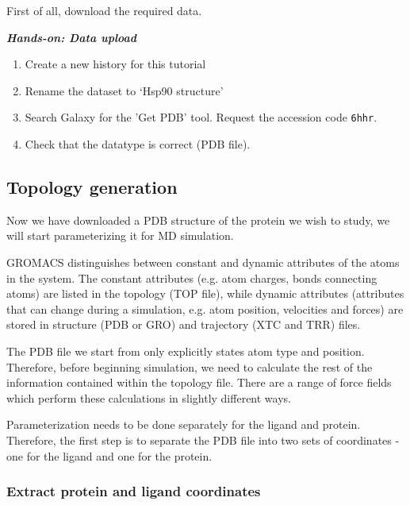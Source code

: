 \documentclass[twocolumn]{bmcart}%
\providecommand{\tightlist}{%
  \setlength{\itemsep}{0pt}\setlength{\parskip}{0pt}}
\providecommand{\tightlist}{%
  \setlength{\itemsep}{0pt}\setlength{\parskip}{0pt}}
\newenvironment{handson_box}
    {\begin{center}
    
    \begin{tabular}{|p{0.9\textwidth/2}|}
    \hline\\
    }
    { 
    \\\\\hline
    \end{tabular} 
    \end{center}
    }
\begin{document}
First of all, download the required data.
\begin{handson_box}
\textbf{\emph{Hands-on: Data upload}}

\begin{enumerate}
\def\labelenumi{\arabic{enumi}.}
\tightlist
\item
  Create a new history for this tutorial

\item
  Rename the dataset to `Hsp90 structure'
\item
  Search Galaxy for the 'Get PDB' tool. Request the accession code \texttt{6hhr}.
\item
  Check that the datatype is correct (PDB file).
\end{enumerate}
\end{handson_box}
\subsection{Topology generation}\label{topology-generation}

Now we have downloaded a PDB structure of the protein we wish to study, we will start parameterizing it for MD simulation.

GROMACS distinguishes between constant and dynamic attributes of the
atoms in the system. The constant attributes (e.g. atom charges, bonds
connecting atoms) are listed in the topology (TOP file), while dynamic
attributes (attributes that can change during a simulation, e.g. atom
position, velocities and forces) are stored in structure (PDB or GRO)
and trajectory (XTC and TRR) files.

The PDB file we start from only explicitly states atom type and
position. Therefore, before beginning simulation, we need to calculate
the rest of the information contained within the topology file. There
are a range of force fields which perform these calculations in slightly
different ways.


Parameterization needs to be done separately for the ligand and protein.
Therefore, the first step is to separate the PDB file into two sets of
coordinates - one for the ligand and one for the protein.

\subsubsection{Extract protein and ligand
coordinates}\label{extract-protein-and-ligand-coordinates}
\end{document}
